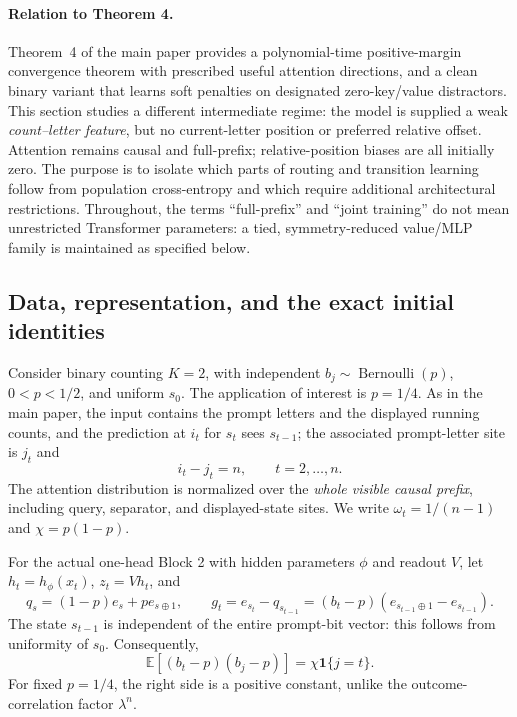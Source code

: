 \paragraph{Relation to Theorem 4.}
Theorem~4 of the main paper provides a polynomial-time positive-margin
convergence theorem with prescribed useful attention directions, and a clean
binary variant that learns soft penalties on designated zero-key/value
distractors.  This section studies a different intermediate regime: the model
is supplied a weak \emph{count--letter feature}, but no current-letter position
or preferred relative offset.  Attention remains causal and full-prefix;
relative-position biases are all initially zero.  The purpose is to isolate
which parts of routing and transition learning follow from population
cross-entropy and which require additional architectural restrictions.
Throughout, the terms ``full-prefix'' and ``joint training'' do not mean
unrestricted Transformer parameters: a tied, symmetry-reduced value/MLP
family is maintained as specified below.

\subsection{Data, representation, and the exact initial identities}
\label{app:weak-routing-initial}

Consider binary counting $K=2$, with independent
$b_j\sim\operatorname{Bernoulli}(p)$, $0<p<1/2$, and uniform $s_0$.
The application of interest is $p=1/4$.  As in the main paper, the input
contains the prompt letters and the displayed running counts, and the
prediction at $i_t$ for $s_t$ sees $s_{t-1}$; the associated prompt-letter
site is $j_t$ and
\begin{equation}\label{eq:lr-constant-lag}
 i_t-j_t=n,\qquad t=2,\ldots,n.
\end{equation}
The attention distribution is normalized over the \emph{whole visible causal
prefix}, including query, separator, and displayed-state sites.  We write
$\omega_t=1/(n-1)$ and $\chi=p(1-p)$.

For the actual one-head Block 2 with hidden parameters $\phi$ and readout
$V$, let $h_t=h_\phi(x_t)$, $z_t=Vh_t$, and
\begin{equation}
 q_s=(1-p)e_s+pe_{s\oplus1},\qquad
 g_t=e_{s_t}-q_{s_{t-1}}=(b_t-p)(e_{s_{t-1}\oplus1}-e_{s_{t-1}}).
\end{equation}
The state $s_{t-1}$ is independent of the entire prompt-bit vector: this
follows from uniformity of $s_0$.  Consequently,
\begin{equation}\label{eq:lr-innovation-cov}
 \mathbb E[(b_t-p)(b_j-p)]=\chi\mathbf 1\{j=t\}.
\end{equation}
For fixed $p=1/4$, the right side is a positive constant, unlike the
outcome-correlation factor $\lambda^n$.

